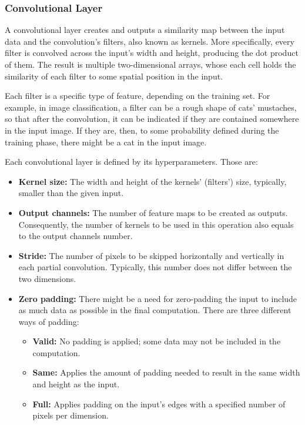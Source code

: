 \subsubsection{Convolutional Layer}
A convolutional layer creates and outputs a similarity map between the input data and the convolution's filters, also known as kernels. More specifically, every filter is convolved across the input's width and height, producing the dot product of them. The result is multiple two-dimensional arrays, whose each cell holds the similarity of each filter to some spatial position in the input.

Each filter is a specific type of feature, depending on the training set. For example, in image classification, a filter can be a rough shape of cats' mustaches, so that after the convolution, it can be indicated if they are contained somewhere in the input image. If they are, then, to some probability defined during the training phase, there might be a cat in the input image.

Each convolutional layer is defined by its hyperparameters. Those are:
\begin{itemize}
	\item \textbf{Kernel size:} The width and height of the kernels' (filters') size, typically, small\-er than the given input.
	\item \textbf{Output channels:} The number of feature maps to be created as outputs. Consequently, the number of kernels to be used in this operation also equals to the output channels number.
	\item \textbf{Stride:} The number of pixels to be skipped horizontally and vertically in each partial convolution. Typically, this number does not differ between the two dimensions.
	\item \textbf{Zero padding:} There might be a need for zero-padding the input to include as much data as possible in the final computation. There are three different ways of padding:
	      \begin{itemize}
		      \item \textbf{Valid:} No padding is applied; some data may not be included in the computation.
		      \item \textbf{Same:} Applies the amount of padding needed to result in the same width and height as the input.
		      \item \textbf{Full:} Applies padding on the input's edges with a specified number of pixels per dimension.
	      \end{itemize}
\end{itemize}

